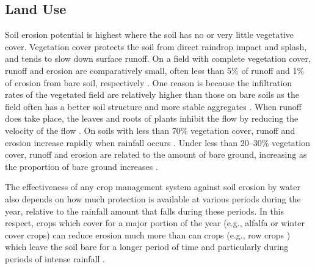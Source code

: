 \subsection{Land Use}
\label{sec:LandUse}

Soil erosion potential is highest where the soil has no or very little
vegetative cover. Vegetation cover protects the soil from direct raindrop impact
and splash, and tends to slow down surface runoff. On a field with complete
vegetation cover, runoff and erosion are comparatively small, often less than
5\% of runoff and 1\% of erosion from bare soil, respectively
\citep{braskerud2001-1447,rey2003-549}. One reason is because the infiltration
rates of the vegetated field are relatively higher than those on bare soils as
the field often has a better soil structure and more stable aggregates
\citep{robinson2001-1}. When runoff does take place, the leaves and roots of
plants inhibit the flow by reducing the velocity of the flow
\citep{braskerud2001-1447,rey2003-549}. On soils with less than 70\% vegetation
cover, runoff and erosion increase rapidly when rainfall occurs
\citep{favis-mortlock1996-529}. Under less than 20--30\% vegetation cover,
runoff and erosion are related to the amount of bare ground, increasing as the
proportion of bare ground increases \citep{favis-mortlock1996-529}.

The effectiveness of any crop management system against soil erosion by water
also depends on how much protection is available at various periods during the
year, relative to the rainfall amount that falls during these periods. In this
respect, crops which cover for a major portion of the year (e.g., alfalfa or
winter cover crops) can reduce erosion much more than can crops (e.g., row crops
) which leave the soil bare for a longer period of time and particularly during
periods of intense rainfall \citep{zhang1995-1069,zhang1995-1079}.

%
%
